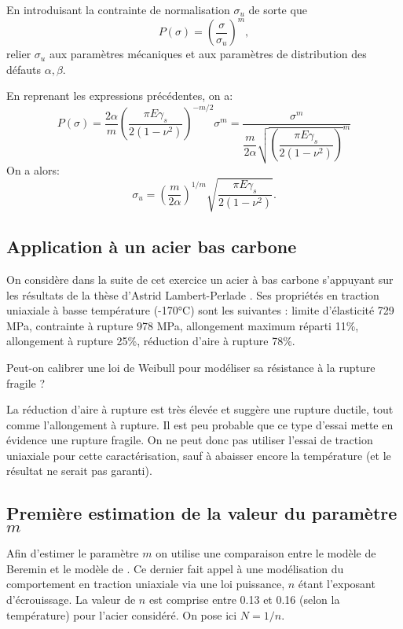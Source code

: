 \begin{questions}
\question En introduisant la contrainte de normalisation $\sigma_u$ de sorte que
\begin{equation}
P(\sigma) =  \left(\dfrac{\sigma}{\sigma_u}\right)^m,
\end{equation}
relier $\sigma_u$ aux paramètres mécaniques et aux paramètres de distribution des défauts $\alpha,\beta$.
\begin{solution}
En reprenant les expressions précédentes, on a:
$$ P(\sigma) = \dfrac{2\alpha}{m}\left(\dfrac{\pi E \gamma_s}{2(1-\nu^2)}\right)^{-m/2} \sigma^{m} = \dfrac{\sigma^m}{\dfrac{m}{2\alpha}\sqrt{\left(\dfrac{\pi E \gamma_s}{2(1-\nu^2)}\right)}^m}$$
On a alors:
$$\sigma_u = \left(\dfrac{m}{2\alpha}\right)^{1/m}\sqrt{\dfrac{\pi E \gamma_s}{2(1-\nu^2)}}.$$
\end{solution}

\subsection{Application à un acier bas carbone}
On considère dans la suite de cet exercice un acier à bas carbone s'appuyant sur les résultats de la thèse d’Astrid
Lambert-Perlade \cite{lambert2001rupture}. Ses propriétés en traction uniaxiale à
basse température (-170°C) sont les suivantes : limite d’élasticité 729 MPa, contrainte à rupture
978 MPa, allongement maximum réparti 11\%, allongement à rupture 25\%, réduction d’aire à rupture
78\%. 

\question Peut-on calibrer une loi de Weibull pour modéliser sa résistance à la rupture
fragile ?
\begin{solution}
La réduction d'aire à rupture est très élevée et suggère une rupture ductile, tout comme l'allongement à
rupture. Il est peu probable que ce type d'essai mette en évidence une rupture fragile. On ne peut donc
pas utiliser l'essai de traction uniaxiale pour cette caractérisation, sauf à abaisser encore la température
(et le résultat ne serait pas garanti).
\end{solution}

\subsection{Première estimation de la valeur du paramètre $m$}

Afin d’estimer le paramètre $m$ on utilise une comparaison entre le modèle de Beremin et le modèle de
\cite{curry1979effect}. Ce dernier fait appel à une modélisation du comportement en traction uniaxiale
via une loi puissance, $n$ étant l’exposant d’écrouissage. La valeur de $n$ est comprise entre 0.13 et 0.16
(selon la température) pour l’acier considéré. On pose ici $N = 1/n$.


\end{questions}
